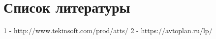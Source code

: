 \documentclass[./nirs.tex]{subfiles}
\begin{document}
\section*{Список литературы}
	1 - http://www.tekinsoft.com/prod/atts/
	2 - https://avtoplan.ru/lp/
\end{document}
